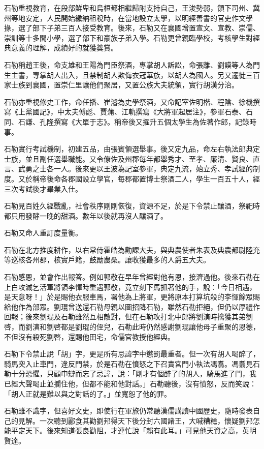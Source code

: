 石勒重視教育，在段部鮮卑和烏桓都相繼歸附支持自己，王浚勢弱，領下司州、冀州等地安定，人民開始繳納租稅時，在當地設立太學，以明經善書的官吏作文學掾，選了部下子弟三百人接受教育。後來，石勒又在襄國增置宣文、宣教、崇儒、崇訓等十多間小學，選了部下和豪族子弟入學。石勒更曾親臨學校，考核學生對經典意義的理解，成績好的就獲獎賞。

石勒稱趙王後，命支雄和王陽為門臣祭酒，專掌胡人訴訟，命張離、劉謨等人為門生主書，專掌胡人出入，且禁制胡人欺侮衣冠華族，以胡人為國人。另又遷徙三百家士族到襄國，置崇仁里讓他們聚居，又置公族大夫統領，實行胡漢分治。

石勒亦重視修史工作，命任播、崔濬為史學祭酒，又命記室佐明楷、程陰、徐機撰寫《上黨國記》，中太夫傅彪、賈蒲、江軌撰寫《大將軍起居注》，參軍石泰、石同、石謙、孔隆撰寫《大單于志》。稱帝後又擢升五個太學生為佐著作郎，記錄時事。

石勒實行考試機制，初建五品，由張賓領選舉事。後又定九品，命左右執法郎典定士族，並且副任選舉職能。又令僚佐及州郡每年都舉秀才、至孝、廉清、賢良、直言、武勇之士各一人。後來更以王波為記室參軍，典定九流，始立秀、孝試經的制度。又於稱帝後命各郡國設立學官，每郡都置博士祭酒二人，學生一百五十人，經三次考試後才畢業入仕。

石勒見百姓久經戰亂，社會秩序剛剛恢復，資源不足，於是下令禁止釀酒，祭祀時都只用發酵一晚的甜酒。數年以後就再沒人釀酒了。

石勒又命人重訂度量衡。

石勒在北方推度耕作，以右常侍霍皓為勸課大夫，與典農使者朱表及典農都尉陸充等巡核各州郡，核實戶籍，鼓勵農桑。讓收獲最多的人爵五大夫。

石勒感恩，並會作出報答。例如郭敬在早年曾經對他有恩，接濟過他。後來石勒在上白攻滅乞活軍將領李惲時重遇郭敬，竟立刻下馬抓著他的手，說：「今日相遇，是天意呀！」於是賜他衣服車馬，署他為上將軍，更將原本打算坑殺的李惲餘眾賜給他作為部眾。劉琨曾送還石勒母親以圖招降石勒，雖然石勒拒絕，但仍以厚禮作回報；後來劉琨及石勒雖然互相敵對，但在石勒攻打北中郎將劉演時擒獲其弟劉啓，而劉演和劉啓都是劉琨的侄兒，石勒此時仍然感謝劉琨讓他母子重聚的恩德，不但沒有殺死劉啓，還賜他田宅，命儒官教授他經典。

石勒下令禁止說「胡」字，更是所有忌諱字中懲罰最重者。但一次有胡人喝醉了，騎馬突入止車門，違反門禁，於是石勒在憤怒之下召責宮門小執法馮翥。馮翥見石勒十分恐懼，只顧申辯而忘了忌諱，說：「剛才有個醉了的胡人，騎馬進了門，我已經大聲喝止並攔住他，但都不能和他對話。」石勒聽後，沒有憤怒，反而笑說：「胡人正就是難以與之對話的了。」並寬恕了他的罪。

石勒雖不識字，但喜好文史，即使行在軍旅仍常聽漢儒講讀中國歷史，隨時發表自己的見解。一次聽到酈食其勸劉邦得天下後分封六國諸王，大喊糟糕，懷疑劉邦怎能平定天下。後來知道張良勸阻，才連忙說「賴有此耳。」可見他天資之高，英明賢達。

